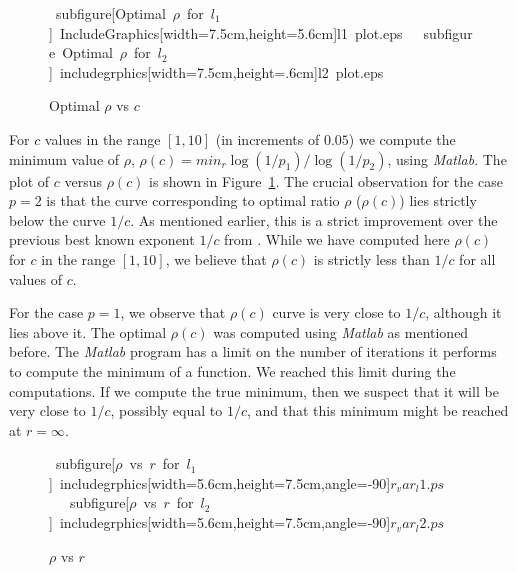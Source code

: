 \documentclass[12pt]{article}
\begin{document}
\begin{figure}[t]
\begin{center}
\mbox{
subfigure[Optimal $\rho$ for $l_1$]{
IncludeGraphics[width=7.5cm,height=5.6cm]{l1 plot.eps}
\label{fig:l1_plot}
} \quad
subfigure Optimal $\rho$ for $l_2$]{
includegrphics[width=7.5cm,height=.6cm]{l2 plot.eps}
\label{fig:l2_plot}
}
}
\caption{Optimal $\rho$ vs $c$}
\label{fig:opt_rho}
\end{center}
\end{figure}

For $c$ values in the range $[1,10]$ (in increments of $0.05$) we compute
the minimum value of $\rho$, $\rho(c) = min_r \log ({1/p_1})/\log
({1/p_2})$, using {\em Matlab}. The plot of $c$ versus $\rho(c)$ is shown
in Figure~\ref{fig:opt_rho}. The crucial observation for the case $p=2$ is
that the curve corresponding to optimal ratio $\rho$ ($\rho(c)$) lies
strictly below the curve $1/c$. As mentioned earlier, this is a strict
improvement over the previous best known exponent $1/c$ from
\cite{IM}. While we have computed here $\rho(c)$ for $c$
in the range $[1,10]$, we believe that $\rho(c)$ is strictly less than
$1/c$ for all values of $c$. 

For the case $p=1$, we observe that $\rho(c)$ curve is very close to
$1/c$, although it lies above it. The optimal $\rho(c)$ was
computed using {\em Matlab} as mentioned before. The {\em Matlab} program
has a limit on the number of iterations it performs to compute the minimum
of a function. We reached this limit during the computations. If we
compute the true minimum, then we suspect that it will be very close to
$1/c$, possibly equal to $1/c$, and that this minimum might be reached at
$r = \infty$.

\begin{figure}[t]
\begin{center}
\mbox{
subfigure[$\rho$ vs $r$ for $l_1$]{
includegrphics[width=5.6cm,height=7.5cm,angle=-90]{$r_var_l1.ps$}
\label{Fig:r_var_l1}
} \quad
subfigure[$\rho$ vs $r$ for $l_2$]{
includegrphics[width=5.6cm,height=7.5cm,angle=-90]{$r_var_l2.ps$}
\label{Fig:r_var_l2}
}
}
\caption{$\rho$ vs $r$}
\label{fig:r_var}
\end{center}
\end{figure}
\end{document}
